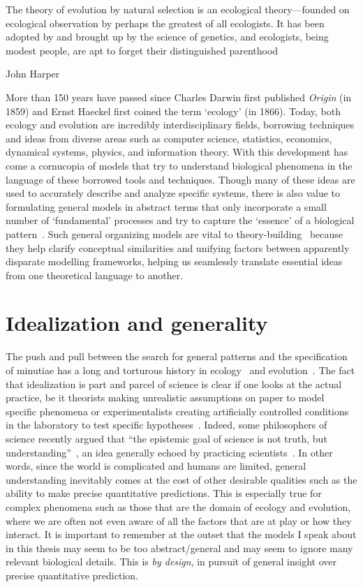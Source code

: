 \epigraph{\justifying The theory of evolution by natural selection is an ecological theory—founded on ecological observation by perhaps the greatest of all ecologists. It has been adopted by and brought up by the science of genetics, and ecologists, being modest people, are apt to forget their distinguished parenthood}{John Harper~\citep{harper_darwinian_1967}}

More than 150 years have passed since Charles Darwin first published \textit{Origin} (in 1859) and Ernst Haeckel first coined the term ‘ecology’ (in 1866). Today, both ecology and evolution are incredibly interdisciplinary fields, borrowing techniques and ideas from diverse areas such as computer science, statistics, economics, dynamical systems, physics, and information theory. With this development has come a cornucopia of models that try to understand biological phenomena in the language of these borrowed tools and techniques. Though many of these ideas are used to accurately describe and analyze specific systems, there is also value to formulating general models in abstract terms that only incorporate a small number of `fundamental' processes and try to capture the `essence' of a biological pattern~\citep{frank_natural_2012, vellend_theory_2016,luque_mirror_2021}. Such general organizing models are vital to theory-building~\citep{luque_mirror_2021} because they help clarify conceptual similarities and unifying factors between apparently disparate modelling frameworks, helping us seamlessly translate essential ideas from one theoretical language to another.

\section{Idealization and generality}\label{idealization}
The push and pull between the search for general patterns and the specification of minutiae has a long and torturous history in ecology~\citep{kingsland_modeling_1985} and evolution~\citep{provine_origins_2001}. The fact that idealization is part and parcel of science is clear if one looks at the actual practice, be it theorists making unrealistic assumptions on paper to model specific phenomena or experimentalists creating artificially controlled conditions in the laboratory to test specific hypotheses~\citep{zuk_models_2018}. Indeed, some philosophers of science recently argued that ``the epistemic goal of science is not truth, but understanding''~\citep{potochnik_idealization_2018}, an idea generally echoed by practicing scientists~\citep{levins_strategy_1966,zuk_models_2018,grainger_empiricists_2022}.  In other words, since the world is complicated and humans are limited, general understanding inevitably comes at the cost of other desirable qualities such as the ability to make precise quantitative predictions. This is especially true for complex phenomena such as those that are the domain of ecology and evolution, where we are often not even aware of all the factors that are at play or how they interact. It is important to remember at the outset that the models I speak about in this thesis may seem to be too abstract/general and may seem to ignore many relevant biological details. This is \textit{by design}, in pursuit of general insight over precise quantitative prediction.

